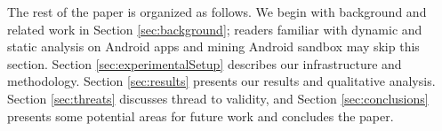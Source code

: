 The rest of the paper is organized as follows. We begin with background and related work in Section \ref{sec:background};
readers familiar with dynamic and static analysis on Android apps and mining Android sandbox may skip this section.
Section \ref{sec:experimentalSetup} describes our infrastructure and methodology. Section \ref{sec:results} presents our results and qualitative analysis. Section \ref{sec:threats} discusses thread to validity, and Section \ref{sec:conclusions} 
presents some potential areas for future work and concludes the paper.




